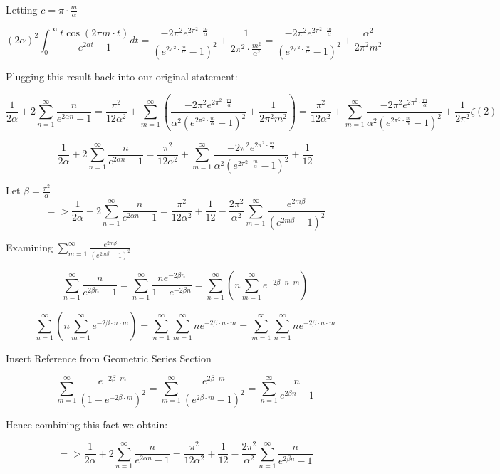 ﻿\documentclass[a4paper]{article}
\begin{document}
Letting $c=\pi \cdot \frac{m}{\alpha}$ 

$$
(2\alpha)^2\int_{0}^{\infty}\frac{t\cos(2 \pi m \cdot t)}{e^{2\alpha t}-1}dt
=\frac{-2\pi^2e^{2\pi^2 \cdot \frac{m}{\alpha}}}{(e^{2\pi^2 \cdot \frac{m}{\alpha}}-1)^2} + \frac{1}{2\pi^2 \cdot \frac{m^2}{\alpha^2}}
=\frac{-2\pi^2e^{2\pi^2 \cdot \frac{m}{\alpha}}}{(e^{2\pi^2 \cdot \frac{m}{\alpha}}-1)^2} + \frac{\alpha^2}{2\pi^2 m^2}
$$

Plugging this result back into our original statement:

$$\frac{1}{2\alpha} + 2\sum_{n=1}^{\infty} \frac{n}{e^{2\alpha n}-1}
=\frac{\pi^2}{12\alpha^2} + \sum_{m=1}^{\infty} (\frac{-2\pi^2e^{2\pi^2 \cdot \frac{m}{\alpha}}}{\alpha^2(e^{2\pi^2 \cdot \frac{m}{\alpha}}-1)^2} + \frac{1}{2\pi^2 m^2})
=\frac{\pi^2}{12\alpha^2} + \sum_{m=1}^{\infty} \frac{-2\pi^2e^{2\pi^2 \cdot \frac{m}{\alpha}}}{\alpha^2(e^{2\pi^2 \cdot \frac{m}{\alpha}}-1)^2} + \frac{1}{2\pi^2}\zeta(2)
$$

$$
\frac{1}{2\alpha} + 2\sum_{n=1}^{\infty} \frac{n}{e^{2\alpha n}-1}
=\frac{\pi^2}{12\alpha^2} + \sum_{m=1}^{\infty} \frac{-2\pi^2e^{2\pi^2 \cdot \frac{m}{\alpha}}}{\alpha^2(e^{2\pi^2 \cdot \frac{m}{\alpha}}-1)^2} + \frac{1}{12}
$$

Let $\beta = \frac{\pi^2}{\alpha}$
$$=>
\frac{1}{2\alpha} + 2\sum_{n=1}^{\infty} \frac{n}{e^{2\alpha n}-1}
=\frac{\pi^2}{12\alpha^2}+ \frac{1}{12} -\frac{2\pi^2}{\alpha^2}\sum_{m=1}^{\infty} \frac{e^{2m\beta}}{(e^{2m\beta}-1)^2}
$$

Examining $\sum_{m=1}^{\infty} \frac{e^{2m\beta}}{(e^{2m\beta}-1)^2}$

$$
\sum_{n=1}^{\infty} \frac{n}{e^{2\beta n}-1}
=\sum_{n=1}^{\infty} \frac{ne^{-2\beta n}}{1-e^{-2\beta n}}
=\sum_{n=1}^{\infty} (n\sum_{m=1}^{\infty} e^{-2\beta \cdot n \cdot m})
$$

$$
\sum_{n=1}^{\infty} (n\sum_{m=1}^{\infty} e^{-2\beta \cdot n \cdot m})
=\sum_{n=1}^{\infty}\sum_{m=1}^{\infty} ne^{-2\beta \cdot n \cdot m}
=\sum_{m=1}^{\infty}\sum_{n=1}^{\infty} ne^{-2\beta \cdot n \cdot m}
$$

Insert Reference from Geometric Series Section

$$
\sum_{m=1}^{\infty}\frac{e^{-2\beta \cdot m}}{(1-e^{-2\beta \cdot m})^2}
=\sum_{m=1}^{\infty}\frac{e^{2\beta \cdot m}}{(e^{2\beta \cdot m}-1)^2}
=\sum_{n=1}^{\infty} \frac{n}{e^{2\beta n}-1}
$$

Hence combining this fact we obtain:

$$=>
\frac{1}{2\alpha} + 2\sum_{n=1}^{\infty} \frac{n}{e^{2\alpha n}-1}
=\frac{\pi^2}{12\alpha^2}+ \frac{1}{12} -\frac{2\pi^2}{\alpha^2}\sum_{n=1}^{\infty} \frac{n}{e^{2\beta n}-1}
$$
\end{document}
